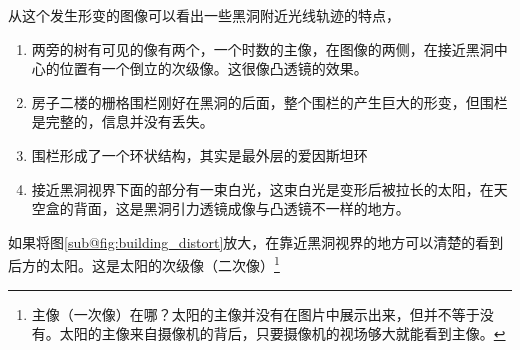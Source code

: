 从这个发生形变的图像可以看出一些黑洞附近光线轨迹的特点，
\begin{enumerate}
    \item 两旁的树有可见的像有两个，一个时数的主像，在图像的两侧，在接近黑洞中心的位置有一个倒立的次级像。这很像凸透镜的效果。
    \item 房子二楼的栅格围栏刚好在黑洞的后面，整个围栏的产生巨大的形变，但围栏是完整的，信息并没有丢失。
    \item 围栏形成了一个环状结构，其实是最外层的爱因斯坦环
    \item 接近黑洞视界下面的部分有一束白光，这束白光是变形后被拉长的太阳，在天空盒的背面，这是黑洞引力透镜成像与凸透镜不一样的地方。
\end{enumerate}
如果将图\ref{sub@fig:building_distort}放大，在靠近黑洞视界的地方可以清楚的看到后方的太阳。这是太阳的次级像（二次像）\footnote{主像（一次像）在哪？太阳的主像并没有在图片中展示出来，但并不等于没有。太阳的主像来自摄像机的背后，只要摄像机的视场够大就能看到主像。}

